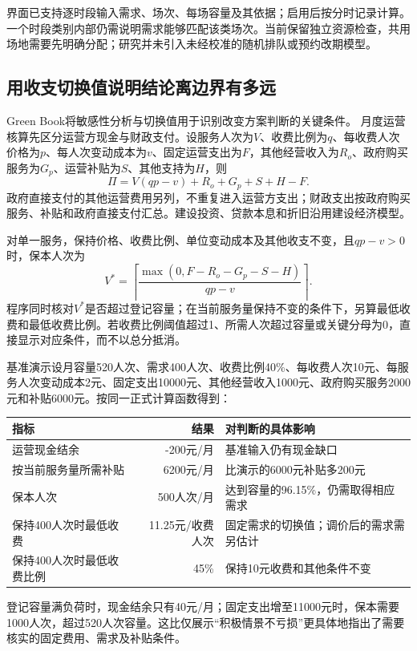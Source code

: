界面已支持逐时段输入需求、场次、每场容量及其依据；启用后按分时记录计算。一个时段类别内部仍需说明需求能够匹配该类场次。当前保留独立资源检查，共用场地需要先明确分配；研究并未引入未经校准的随机排队或预约改期模型。

\subsection{用收支切换值说明结论离边界有多远}

Green Book将敏感性分析与切换值用于识别改变方案判断的关键条件。\cite{greenbook2026} 月度运营核算先区分运营方现金与财政支付。设服务人次为$V$、收费比例为$q$、每收费人次价格为$p$、每人次变动成本为$v$、固定运营支出为$F$，其他经营收入为$R_o$、政府购买服务为$G_p$、运营补贴为$S$、其他支持为$H$，则
\begin{equation}
 \Pi=V(qp-v)+R_o+G_p+S+H-F.
\end{equation}
政府直接支付的其他运营费用另列，不重复进入运营方支出；财政支出按政府购买服务、补贴和政府直接支付汇总。建设投资、贷款本息和折旧沿用建设经济模型。

对单一服务，保持价格、收费比例、单位变动成本及其他收支不变，且$qp-v>0$时，保本人次为
\begin{equation}
 V^*=\left\lceil\frac{\max(0,F-R_o-G_p-S-H)}{qp-v}\right\rceil.
\end{equation}
程序同时核对$V^*$是否超过登记容量；在当前服务量保持不变的条件下，另算最低收费和最低收费比例。若收费比例阈值超过1、所需人次超过容量或关键分母为0，直接显示对应条件，而不以总分抵消。

基准演示设月容量520人次、需求400人次、收费比例40\%、每收费人次10元、每服务人次变动成本2元、固定支出10000元、其他经营收入1000元、政府购买服务2000元和补贴6000元。按同一正式计算函数得到：
\begin{center}\small
\begin{tabular}{@{}L{55mm}rL{70mm}@{}}
\toprule 指标 & 结果 & 对判断的具体影响\\\midrule

运营现金结余 & -200元/月 & 基准输入仍有现金缺口\\
按当前服务量所需补贴 & 6200元/月 & 比演示的6000元补贴多200元\\
保本人次 & 500人次/月 & 达到容量的96.15\%，仍需取得相应需求\\
保持400人次时最低收费 & 11.25元/收费人次 & 固定需求的切换值；调价后的需求需另估计\\
保持400人次时最低收费比例 & 45\% & 保持10元收费和其他条件不变\\

\bottomrule\end{tabular}\end{center}
登记容量满负荷时，现金结余只有40元/月；固定支出增至11000元时，保本需要1000人次，超过520人次容量。这比仅展示“积极情景不亏损”更具体地指出了需要核实的固定费用、需求及补贴条件。


